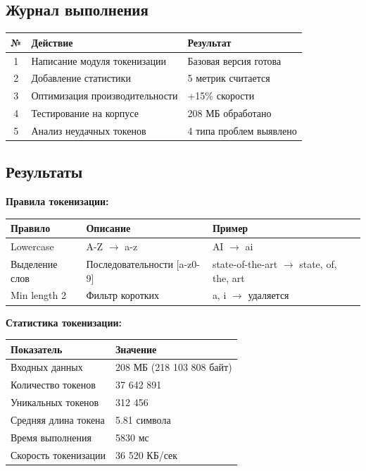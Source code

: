 \documentclass[a4paper, 12pt]{article}
\begin{document}
\subsection*{Журнал выполнения}
\begin{table}[h]
\centering
\begin{tabular}{|c|l|l|}
\hline
\textbf{№} & \textbf{Действие} & \textbf{Результат} \\ \hline
1 & Написание модуля токенизации & Базовая версия готова \\ \hline
2 & Добавление статистики & 5 метрик считается \\ \hline
3 & Оптимизация производительности & +15\% скорости \\ \hline
4 & Тестирование на корпусе & 208 МБ обработано \\ \hline
5 & Анализ неудачных токенов & 4 типа проблем выявлено \\ \hline
\end{tabular}
\end{table}

\subsection*{Результаты}
\textbf{Правила токенизации:}
\begin{table}[h]
\begin{tabular}{|p{3cm}|p{5cm}|p{7cm}|}
\hline
\textbf{Правило} & \textbf{Описание} & \textbf{Пример} \\ \hline
Lowercase & A-Z $\rightarrow$ a-z & AI $\rightarrow$ ai \\ \hline
Выделение слов & Последовательности [a-z0-9] & state-of-the-art $\rightarrow$ state, of, the, art \\ \hline
Min length 2 & Фильтр коротких & a, i $\rightarrow$ удаляется \\ \hline
\end{tabular}
\end{table}

\textbf{Статистика токенизации:}
\begin{table}[h]
\begin{tabular}{|l|l|}
\hline
\textbf{Показатель} & \textbf{Значение} \\ \hline
Входных данных & 208 МБ (218 103 808 байт) \\ \hline
Количество токенов & 37 642 891 \\ \hline
Уникальных токенов & 312 456 \\ \hline
Средняя длина токена & 5.81 символа \\ \hline
Время выполнения & 5830 мс \\ \hline
Скорость токенизации & 36 520 КБ/сек \\ \hline
\end{tabular}
\end{table}
\end{document}
